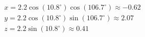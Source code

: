 \documentclass[preview]{standalone}
\begin{document}
\begin{align*}
x = 2.2 \cos(10.8^\circ) \cos(106.7^\circ) \approx -0.62 \\ y = 2.2 \cos(10.8^\circ) \sin(106.7^\circ) \approx 2.07 \\ z = 2.2 \sin(10.8^\circ) \approx 0.41
\end{align*}
\end{document}
